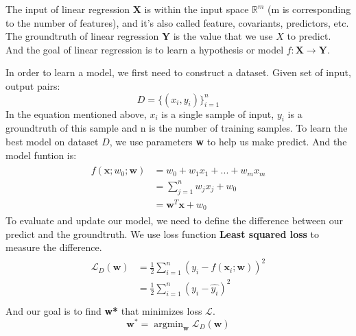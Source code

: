 \documentclass[journal, a4paper]{IEEEtran}
\begin{document}
The input of linear regression $\textbf{X}$ is within the input space $\mathbb{R}^m$ (m is corresponding to the number of features), and it's also called feature, covariants, predictors, etc.
The groundtruth of linear regression $\textbf{Y}$ is the value that we use $X$ to predict.
And the goal of linear regression is to learn a hypothesis or model $f : \textbf{X} \rightarrow \textbf{Y}$.

In order to learn a model, we first need to construct a dataset. Given set of input, output pairs: \begin{equation}
D=\{(x_i, y_i)\}^{n}_{i=1}
\end{equation} In the equation mentioned above, $x_i $ is a single sample of input, $y_i$ is a groundtruth of this sample and n is the number of training samples. To learn the best model on dataset $D$, we use parameters \textbf{w} to help us make predict. And the model funtion is:
\begin{equation}
\begin{split}
\begin{aligned}
f(\textbf{x}; w_0; \textbf{w}) &= w_0 + w_1x_1 + ... + w_mx_m \\
&= \sum_{j=1}^{n}{w_jx_j}+w_0 \\
&= \textbf{w}^T\textbf{x} + w_0
\end{aligned}
\end{split}
\end{equation}
To evaluate and update our model, we need to define the difference between our predict and the groundtruth. We use loss function \textbf{Least squared loss} to measure the difference. 
\begin{equation}
\begin{split}
\begin{aligned}
\mathcal{L}_D(\textbf{w})&= \frac{1}{2}\sum_{i=1}^{n}{(y_i-f(\textbf{x}_i; \textbf{w}))}^2 \\
&= \frac{1}{2}\sum_{i=1}^{n}{(y_i-\hat{y_i})}^2 \\
\end{aligned}
\end{split}
\end{equation}
And our goal is to find \textbf{w*} that minimizes loss $\mathcal{L}$.
\begin{equation}
\textbf{w}^* = \mathop{\arg\min}_{\textbf{w}} \mathcal{L}_D(\textbf{w})
\end{equation}
\end{document}

